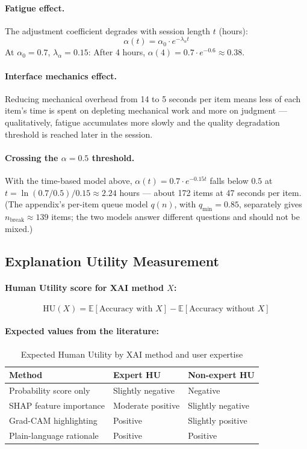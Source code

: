 \paragraph{Fatigue effect.} The adjustment coefficient degrades with session length $t$ (hours):
\[
\alpha(t) = \alpha_0 \cdot e^{-\lambda_\alpha t}
\]
At $\alpha_0 = 0.7$, $\lambda_\alpha = 0.15$: After 4 hours, $\alpha(4) = 0.7 \cdot e^{-0.6} \approx 0.38$.

\paragraph{Interface mechanics effect.} Reducing mechanical overhead from 14 to 5 seconds per item means less of each item's time is spent on depleting mechanical work and more on judgment --- qualitatively, fatigue accumulates more slowly and the quality degradation threshold is reached later in the session.

\paragraph{Crossing the $\alpha = 0.5$ threshold.} With the time-based model above, $\alpha(t) = 0.7 \cdot e^{-0.15t}$ falls below $0.5$ at $t = \ln(0.7/0.5)/0.15 \approx 2.24$ hours --- about 172 items at 47 seconds per item. (The appendix's per-item queue model $q(n)$, with $q_{\min} = 0.85$, separately gives $n_{\text{break}} \approx 139$ items; the two models answer different questions and should not be mixed.)

\subsection{Explanation Utility Measurement}

\paragraph{Human Utility score for XAI method $X$:}
\[
\text{HU}(X) = \mathbb{E}[\text{Accuracy with } X] - \mathbb{E}[\text{Accuracy without } X]
\]

\paragraph{Expected values from the literature:}
\begin{table}[htbp]
\caption{Expected Human Utility by XAI method and user expertise}
\label{tab:human-utility-ch06}
\centering
\begin{tabular}{@{}p{4cm}p{3.5cm}p{3.5cm}@{}}
\toprule
\textbf{Method} & \textbf{Expert HU} & \textbf{Non-expert HU} \\
\midrule
Probability score only & Slightly negative & Negative \\
SHAP feature importance & Moderate positive & Slightly negative \\
Grad-CAM highlighting & Positive & Slightly positive \\
Plain-language rationale & Positive & Positive \\
\bottomrule
\end{tabular}
\end{table}

